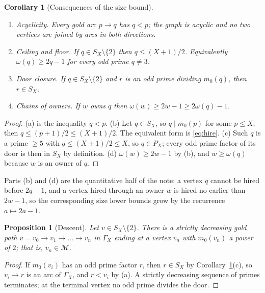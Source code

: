 \documentclass[11pt,a4paper]{article}
\newtheorem{corollary}[theorem]{Corollary}
\newtheorem{proposition}[theorem]{Proposition}
\theoremstyle{remark}
\newcommand{\pow}{\mathcal{M}}   %
\begin{document}
\begin{corollary}[Consequences of the size bound]\label{cor:consequences}
\begin{enumerate}
\item[(a)] \emph{Acyclicity.} Every gold arc \(p\to q\) has \(q<p\); the graph is acyclic and no two vertices are joined by arcs in both directions.
\item[(b)] \emph{Ceiling and floor.} If \(q\in S_X\setminus\{2\}\) then \(q\le (X+1)/2\). Equivalently \(\omega(q)\ge 2q-1\) for every odd prime \(q\neq 3\).
\item[(c)] \emph{Door closure.} If \(q\in S_X\setminus\{2\}\) and \(r\) is an odd prime dividing \(m_0(q)\), then \(r\in S_X\).
\item[(d)] \emph{Chains of owners.} If \(w\) owns \(q\) then \(\omega(w)\ge 2w-1\ge 2\omega(q)-1\).
\end{enumerate}
\end{corollary}
\begin{proof}
(a) is the inequality \(q<p\).
(b) Let \(q\in S_X\), so \(q\mid m_0(p)\) for some \(p\le X\); then \(q\le (p+1)/2\le (X+1)/2\).
The equivalent form is \eqref{eq:hire}.
(c) Such \(q\) is a prime \(\ge5\) with \(q\le (X+1)/2\le X\), so \(q\in P_X\); every odd prime factor of its door is then in \(S_X\) by definition.
(d) \(\omega(w)\ge 2w-1\) by (b), and \(w\ge \omega(q)\) because \(w\) is an owner of \(q\).
\end{proof}

Parts (b) and (d) are the quantitative half of the note: a vertex \(q\) cannot be hired before \(2q-1\), and a vertex hired through an owner \(w\) is hired no earlier than \(2w-1\), so the corresponding size lower bounds grow by the recurrence \(a\mapsto2a-1\).

\begin{proposition}[Descent]\label{prop:descent}
Let \(v\in S_X\setminus\{2\}\).
There is a strictly decreasing gold path \(v=v_0\to v_1\to\dots\to v_n\) in \(\Gamma_X\) ending at a vertex \(v_n\) with \(m_0(v_n)\) a power of \(2\); that is, \(v_n\in\pow\).
\end{proposition}
\begin{proof}
If \(m_0(v_i)\) has an odd prime factor \(r\), then \(r\in S_X\) by Corollary~\ref{cor:consequences}(c), so \(v_i\to r\) is an arc of \(\Gamma_X\), and \(r<v_i\) by (a).
A strictly decreasing sequence of primes terminates; at the terminal vertex no odd prime divides the door.
\end{proof}
\end{document}
